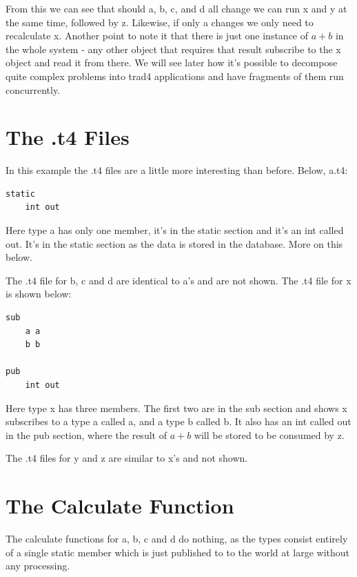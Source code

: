 \documentclass{report}
\begin{document}
From this we can see that should a, b, c, and d all change we can run x and y at the same time, followed by z. Likewise, if only a changes we only need to recalculate x. Another point to note it that there is just one instance of \begin{math} a + b\end{math} in the whole system - any other object that requires that result subscribe to the x object and read it from there. We will see later how it's possible to decompose quite complex problems into trad4 applications and have fragments of them run concurrently.

\section{The .t4 Files}

In this example the .t4 files are a little more interesting than before. Below, a.t4:

\begin{verbatim}
static
    int out
\end{verbatim}

Here type a has only one member, it's in the static section and it's an int called out. It's in the static section as the data is stored in the database. More on this below.

The .t4 file for b, c and d are identical to a's and are not shown. The .t4 file for x is shown below:

\begin{verbatim}
sub
    a a
    b b

pub 
    int out
\end{verbatim}

Here type x has three members. The first two are in the sub section and shows x subscribes to a type a called a, and a type b called b. It also has an int called out in the pub section, where the result of \(a + b\) will be stored to be consumed by z.

The .t4 files for y and z are similar to x's and not shown.

\section{The Calculate Function}

The calculate functions for a, b, c and d do nothing, as the types consist entirely of a single static member which is just published to to the world at large without any processing. 
\end{document}
